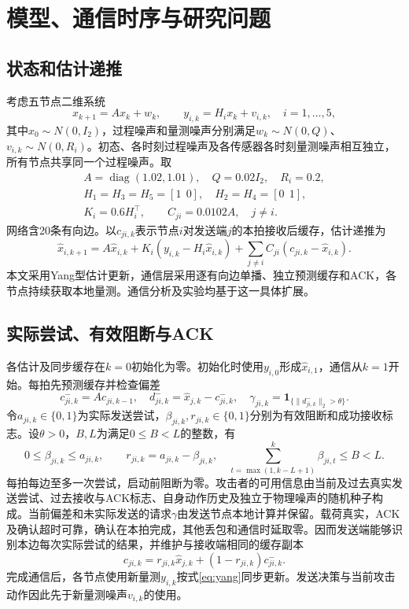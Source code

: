 \documentclass[UTF8,a4paper,zihao=5,fontset=windows]{ctexart}
\newcommand{\ind}{\mathbf 1}
\newcommand{\diag}{\operatorname{diag}}
\begin{document}
\section{模型、通信时序与研究问题}
\subsection{状态和估计递推}
考虑五节点二维系统
\begin{equation}
x_{k+1}=Ax_k+w_k,\qquad y_{i,k}=H_i x_k+v_{i,k},\quad i=1,\ldots,5,
\label{eq:system}
\end{equation}
其中$x_0\sim N(0,I_2)$，过程噪声和量测噪声分别满足$w_k\sim N(0,Q)$、$v_{i,k}\sim N(0,R_i)$。初态、各时刻过程噪声及各传感器各时刻量测噪声相互独立，所有节点共享同一个过程噪声。取
\begin{equation}
\begin{gathered}
A=\diag(1.02,1.01),\quad Q=0.02I_2,\quad R_i=0.2,\\
H_1=H_3=H_5=[1\ \ 0],\quad H_2=H_4=[0\ \ 1],\\
K_i=0.6H_i^\top,\qquad C_{ji}=0.0102A,\quad j\ne i.
\end{gathered}\label{eq:parameters}
\end{equation}
网络含20条有向边。以$c_{ji,k}$表示节点$i$对发送端$j$的本拍接收后缓存，估计递推为
\begin{equation}
\hat x_{i,k+1}=A\hat x_{i,k}
+K_i(y_{i,k}-H_i\hat x_{i,k})
+\sum_{j\ne i}C_{ji}(c_{ji,k}-\hat x_{i,k}).
\label{eq:yang}
\end{equation}
本文采用Yang型估计更新，通信层采用逐有向边单播、独立预测缓存和ACK，各节点持续获取本地量测。通信分析及实验均基于这一具体扩展。

\subsection{实际尝试、有效阻断与ACK}
各估计及同步缓存在$k=0$初始化为零。初始化时使用$y_{i,0}$形成$\hat x_{i,1}$，通信从$k=1$开始。每拍先预测缓存并检查偏差
\begin{equation}
c^-_{ji,k}=Ac_{ji,k-1},\quad
d^-_{ji,k}=\hat x_{j,k}-c^-_{ji,k},\quad
\gamma_{ji,k}=\ind_{\{\|d^-_{ji,k}\|_2>\theta\}}.
\label{eq:trigger}
\end{equation}
令$a_{ji,k}\in\{0,1\}$为实际发送尝试，$\beta_{ji,k},r_{ji,k}\in\{0,1\}$分别为有效阻断和成功接收标志。设$\theta>0$，$B,L$为满足$0\le B<L$的整数，有
\begin{equation}
0\le\beta_{ji,k}\le a_{ji,k},\qquad r_{ji,k}=a_{ji,k}-\beta_{ji,k},
\quad
\sum_{t=\max(1,k-L+1)}^k\beta_{ji,t}\le B<L.
\label{eq:budget}
\end{equation}
每拍每边至多一次尝试，启动前阻断为零。攻击者的可用信息由当前及过去真实发送尝试、过去接收与ACK标志、自身动作历史及独立于物理噪声的随机种子构成。当前偏差和未实际发送的请求$\gamma$由发送节点本地计算并保留。载荷真实，ACK及确认超时可靠，确认在本拍完成，其他丢包和通信时延取零。因而发送端能够识别本边每次实际尝试的结果，并维护与接收端相同的缓存副本
\begin{equation}
c_{ji,k}=r_{ji,k}\hat x_{j,k}+(1-r_{ji,k})c^-_{ji,k}.
\label{eq:cache}
\end{equation}
完成通信后，各节点使用新量测$y_{i,k}$按式\eqref{eq:yang}同步更新。发送决策与当前攻击动作因此先于新量测噪声$v_{i,k}$的使用。
\end{document}
